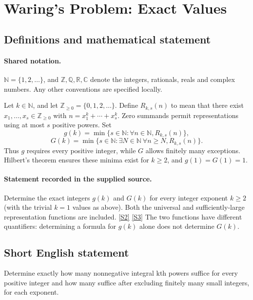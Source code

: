 \documentclass[11pt]{article}
\newcommand{\sref}[2]{\hyperlink{source:#1:#2}{[S#2]}}
\begin{document}
\section{Waring's Problem: Exact Values}\label{statement}

\subsection{Definitions and mathematical statement}

\paragraph{Shared notation.}$\mathbb N=\{1,2,\ldots\}$, and $\mathbb Z,\mathbb Q,\mathbb R,\mathbb C$ denote the integers, rationals, reals and complex numbers. Any other conventions are specified locally.


Let $k\in\mathbb N$, and let $\mathbb Z_{\ge0}=\{0,1,2,\ldots\}$. Define $R_{k,s}(n)$ to mean that there exist $x_1,\ldots,x_s\in\mathbb Z_{\ge0}$ with $n=x_1^k+\cdots+x_s^k$. Zero summands permit representations using at most $s$ positive powers. Set
\[g(k)=\min\{s\in\mathbb N:\forall n\in\mathbb N, R_{k,s}(n)\},\]
\[G(k)=\min\{s\in\mathbb N:\exists N\in\mathbb N\ \forall n\ge N, R_{k,s}(n)\}.\]
Thus $g$ requires every positive integer, while $G$ allows finitely many exceptions. Hilbert's theorem ensures these minima exist for $k\ge2$, and $g(1)=G(1)=1$.
\paragraph{Statement recorded in the supplied source.}
Determine the exact integers $g(k)$ and $G(k)$ for every integer exponent $k\ge2$ (with the trivial $k=1$ values as above). Both the universal and sufficiently-large representation functions are included. \sref{statement}{2} \sref{statement}{3}
The two functions have different quantifiers: determining a formula for $g(k)$ alone does not determine $G(k)$.
\subsection{Short English statement}
Determine exactly how many nonnegative integral kth powers suffice for every positive integer and how many suffice after excluding finitely many small integers, for each exponent.
\end{document}
